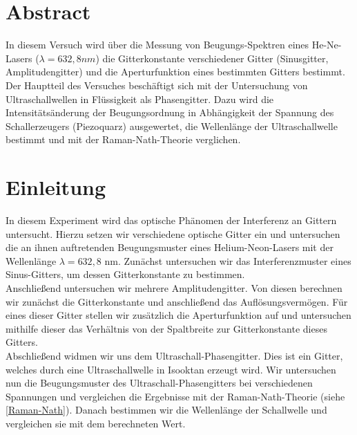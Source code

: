 \documentclass[12pt]{article}
\title{\vspace{0cm}{\Huge Fortgeschrittenen-Praktikum I:\\ \vspace{1cm} Ultraschall}}
\author{Saskia Bondza\\Simon Stephan}
\date{durchgeführt am 20./21.09.2016}
\begin{document}
\maketitle
\newpage

\thispagestyle{empty}
\section*{Abstract}


In diesem Versuch wird über die Messung von Beugungs-Spektren eines He-Ne-Lasers ($\lambda = 632,8nm$) die Gitterkonstante verschiedener Gitter (Sinusgitter, Amplitudengitter) und die Aperturfunktion eines bestimmten Gitters bestimmt. Der Hauptteil des Versuches beschäftigt sich mit der Untersuchung von Ultraschallwellen in Flüssigkeit als Phasengitter. Dazu wird die Intensitätsänderung der Beugungsordnung in Abhängigkeit der Spannung des Schallerzeugers (Piezoquarz) ausgewertet, die Wellenlänge der Ultraschallwelle bestimmt und mit der Raman-Nath-Theorie verglichen.

\newpage
\tableofcontents
\newpage

\section{Einleitung}

In diesem Experiment wird das optische Phänomen der Interferenz an Gittern untersucht. Hierzu setzen wir verschiedene optische Gitter ein und untersuchen die an ihnen auftretenden Beugungsmuster eines Helium-Neon-Lasers mit der Wellenlänge $\lambda = 632,8$ nm. Zunächst untersuchen wir das Interferenzmuster eines Sinus-Gitters, um dessen Gitterkonstante zu bestimmen.\\ 

Anschließend untersuchen wir mehrere Amplitudengitter. Von diesen berechnen wir zunächst die Gitterkonstante und anschließend das Auflösungsvermögen. Für eines dieser Gitter stellen wir zusätzlich die Aperturfunktion auf und untersuchen mithilfe dieser das Verhältnis von der Spaltbreite zur Gitterkonstante dieses Gitters.\\

Abschließend widmen wir uns dem Ultraschall-Phasengitter. Dies ist ein Gitter, welches durch eine Ultraschallwelle in Isooktan erzeugt wird. Wir untersuchen nun die Beugungsmuster des Ultraschall-Phasengitters bei verschiedenen Spannungen und vergleichen die Ergebnisse mit der Raman-Nath-Theorie (siehe \ref{Raman-Nath}). Danach bestimmen wir die Wellenlänge der Schallwelle und vergleichen sie mit dem berechneten Wert.
\end{document}
